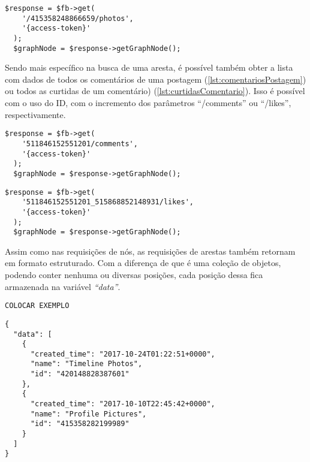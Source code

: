 \begin{lstlisting}[caption={Requisitar as fotos de perfil publicadas na página},label={lst:fotosPagina}]
  $response = $fb->get( 
    '/415358248866659/photos', 
    '{access-token}'
  );
  $graphNode = $response->getGraphNode();
\end{lstlisting}

Sendo mais específico na busca de uma aresta, é possível também obter a lista com dados de todos os comentários de uma postagem (\ref{lst:comentariosPostagem}) ou todos as curtidas de um comentário) (\ref{lst:curtidasComentario}). Isso é possível com o uso do ID, com o incremento dos parâmetros ``/comments'' ou ``/likes'', respectivamente.

\begin{lstlisting}[caption={Requisitar todos os comentários de uma postagem em uma página},label={lst:comentariosPostagem}]
  $response = $fb->get( 
    '511846152551201/comments', 
    '{access-token}'
  );
  $graphNode = $response->getGraphNode();
\end{lstlisting}

\begin{lstlisting}[caption={Requisitar todas as curtidas de um comentário},label={lst:curtidasComentario}]
  $response = $fb->get( 
    '511846152551201_515868852148931/likes', 
    '{access-token}'
  );
  $graphNode = $response->getGraphNode();
\end{lstlisting}

Assim como nas requisições de nós, as requisições de arestas também retornam em formato estruturado. Com a diferença de que é uma coleção de objetos, podendo conter nenhuma ou diversas posições, cada posição dessa fica armazenada na variável \textit{``data''}.

\begin{lstlisting}[caption={Resposta da requisição \ref{lst:feedUsuario} (Feed)},label={lst:respostaFeed}]
COLOCAR EXEMPLO
\end{lstlisting} 

\begin{lstlisting}[caption={Resposta das requisições \ref{lst:albunsPagina}, \ref{lst:fotosPagina} e \ref{lst:videosPagina}  (Álbuns, Fotos e Videos)},label={lst:respostaAlbuns}]
{
  "data": [
    {
      "created_time": "2017-10-24T01:22:51+0000",
      "name": "Timeline Photos",
      "id": "420148828387601"
    },
    {
      "created_time": "2017-10-10T22:45:42+0000",
      "name": "Profile Pictures",
      "id": "415358282199989"
    }
  ]
}
\end{lstlisting}

